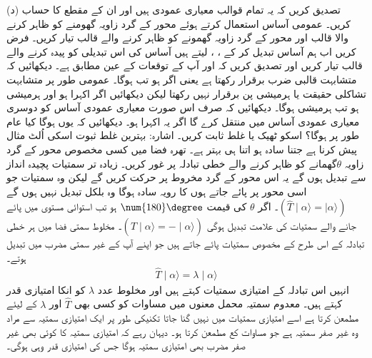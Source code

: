 (د) تصدیق کریں کہ یہ تمام قوالب معیاری عمودی ہیں اور ان کے مقطع کا حساب کریں۔
عمومی آساس  استعمال کرتے ہوئے محور  کے گرد زاویہ  گھومنے کو ظاہر کرنے والا قالب  اور محور  کے گرد زاویہ  گھمونے کو ظاہر کرنے والے قالب  تیار کریں۔ فرض کریں اب ہم آساس تبدیل کر کے ، ،  لیتے ہیں آساس کی اس تبدیلی کو پیدہ کرنے والے قالب تیار کریں اور تصدیق کریں کہ  اور  آپ کے توقعات کے عین مطابق ہے۔
دیکھائیں کہ متشابہت قالبی ضرب برقرار رکھتا ہے یعنی اگر  ہو تب  ہوگا۔ عمومی طور پر متشابہت تشاکلی حقیقت یا ہرمیشی پن برقرار نہیں رکھتا لیکن دیکھائیں اگر  اکہرا ہو اور  ہرمیشی ہو تب  ہرمیشی ہوگا۔ دیکھائیں کہ  صرف اس صورت معیاری عمودی آساس کو دوسری معیاری عمودی آساس میں منتقل کرے گا اگر یہ اکہرا ہو۔
دیکھائیں کہ  یوں  ہوگا کیا عام طور پر  ہوگا؟ اسکو ٹھیک یا غلط ثابت کریں۔ اشارہ: بہترین غلط ثبوت اسکی اُلٹ مثال پیش کرنا ہے جتنا سادہ ہو اتنا ہی بہتر ہے۔
تھرہ فضا میں کسی مخصوص محور کے گرد زاویہ \(\theta\)گھمانے کو ظاہر کرنے والے خطی تبادلہ پر غور کریں۔ زیادہ تر سمتیات پچیدہ انداز سے تبدیل ہوں گے یہ اس محور کے گرد مخروط پر حرکت کریں گے لیکن وہ سمتیات جو اسی محور پر پائے جاتے ہوں کا رویہ سادہ ہوگا وہ بلکل تبدیل نہیں ہوں گے \((\hat{T}\mid \alpha \rangle=\mid \alpha \rangle)\)۔ اگر \(\theta\) کی قیمت \(\num{180}\degree\) ہو تب استوائی مستوی میں پائے جانے والے سمتیات کی علامت تبدیل ہوگی \((\hat{T}\mid \alpha \rangle = -\mid \alpha \rangle)\)۔ مخلوط سمتی فضا میں ہر خطی تبادلہ کے اس طرح کے مخصوص سمتیات پائے جاتے ہیں جو اپنے آپ کے غیر سمتی مضرب میں تبدیل ہوتے۔
\begin{align}
	\hat{T}\mid\alpha\rangle = \lambda\mid\alpha\rangle
\end{align}
انہیں اس تبادلہ کے امتیازی سمتیات کہتے ہیں اور مخلوط عدد \(\lambda\) کو انکا امتیازی قدر کہتے ہیں۔ معدوم سمتیہ محمل معنوں میں مساوات  کو کسی بھی \(\hat{T}\) اور \(\lambda\) کے لیئے مطمعن کرتا ہے اسے امتیازی سمتیات میں نہیں گنا جاتا تکنیکی طور پر ایک امتیازی سمتیہ سے مراد وہ غیر صفر سمتیہ ہے جو مساوات  کع مطمعن کرتا ہو۔ دیہان رہے کہ امتیازی سمتیہ کا کوئی بھی غیر صفر مضرب بھی امتیازی سمتیہ ہوگا جس کی امتیازی قدر وہی ہوگی۔

